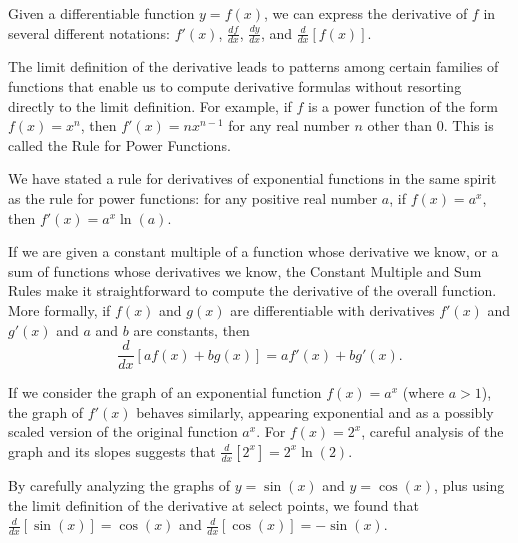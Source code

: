 \begin{summary}
\item Given a differentiable function $y = f(x)$, we can express the derivative of $f$ in several different notations:  $f'(x)$, $\frac{df}{dx}$, $\frac{dy}{dx}$, and $\frac{d}{dx}[f(x)]$.
\item The limit definition of the derivative leads to patterns among certain families of functions that enable us to compute derivative formulas without resorting directly to the limit definition.  For example, if $f$ is a power function of the form $f(x) = x^n$, then $f'(x) = nx^{n-1}$ for any real number $n$ other than $0$.  This is called the Rule for Power Functions.
\item We have stated a rule for derivatives of exponential functions in the same spirit as the rule for power functions:  for any positive real number $a$, if $f(x) = a^x$, then $f'(x) = a^x \ln(a)$.
\item If we are given a constant multiple of a function whose derivative we know, or a sum of functions whose derivatives we know, the Constant Multiple and Sum Rules make it straightforward to compute the derivative of the overall function.  More formally, if $f(x)$ and $g(x)$ are differentiable with derivatives $f'(x)$ and $g'(x)$ and $a$ and $b$ are constants, then
$$\frac{d}{dx} \left[af(x) + bg(x)\right] = af'(x) + bg'(x).$$
\item If we consider the graph of an exponential function $f(x) = a^x$ (where $a > 1$), the graph of $f'(x)$ behaves similarly, appearing exponential and as a possibly scaled version of the original function $a^x$.  For $f(x) = 2^x$, careful analysis of the graph and its slopes suggests that $\frac{d}{dx}[2^x] = 2^x \ln(2)$.
\item By carefully analyzing the graphs of $y = \sin(x)$ and $y = \cos(x)$, plus using the limit definition of the derivative at select points, we found that $\frac{d}{dx} [\sin(x)] = \cos(x)$ and $\frac{d}{dx} [\cos(x)] = -\sin(x)$.
\end{summary}

\clearpage

 

\cleardoublepage